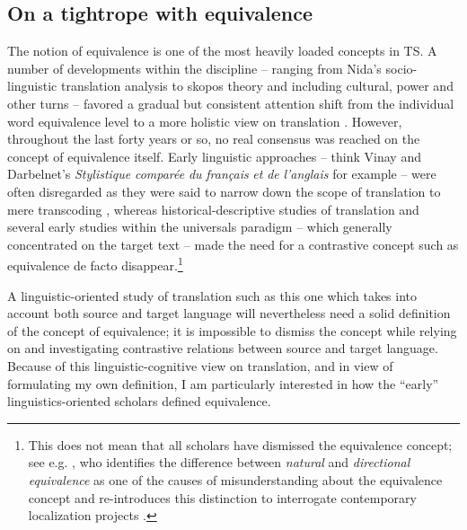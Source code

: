 \subsection{On a tightrope with equivalence}
\label{sec:2.2.4}  
The notion of equivalence is one of the most heavily loaded concepts in TS. A number of developments within the discipline – ranging from Nida’s socio-linguistic translation analysis \citep{nida_toward_1964,nida_theory_1969} to skopos theory \citep{nord_translating_1997} and including cultural, power and other turns – favored a gradual but consistent attention shift from the individual word equivalence level to a more holistic view on translation \citep[10]{munday_issues_2009}. However, throughout the last forty years or so, no real consensus was reached on the concept of equivalence itself. Early linguistic approaches – think Vinay and Darbelnet’s \textit{Stylistique} \textit{comparée} \textit{du} \textit{français} \textit{et} \textit{de} \textit{l’anglais} \citep{vinay_stylistique_1958} for example – were often disregarded as they were said to narrow down the scope of translation to mere transcoding \citep[1]{vandeweghe_introduction:_2007}, whereas historical-descriptive studies of translation and several early studies within the universals paradigm – which generally concentrated on the target text – made the need for a contrastive concept such as equivalence de facto disappear.\footnote{This does not mean that all scholars have dismissed the equivalence concept; see e.g. \citet{pym_natural_2007}, who identifies the difference between \textit{natural} and \textit{directional equivalence} as one of the causes of misunderstanding about the equivalence concept and re-introduces this distinction to interrogate contemporary localization projects \citep[271]{pym_natural_2007}.}

A linguistic-oriented study of translation such as this one which takes into account both source and target language will nevertheless need a solid definition of the concept of equivalence; it is impossible to dismiss the concept while relying on and investigating contrastive relations between source and target language. Because of this linguistic-cognitive view on translation, and in view of formulating my own definition, I am particularly interested in how the ``early'' linguistics-oriented scholars defined equivalence.

